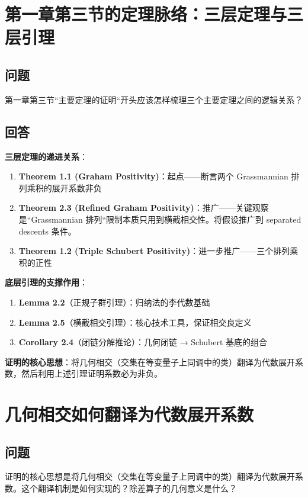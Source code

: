 \section{第一章第三节的定理脉络：三层定理与三层引理}\label{sec:TheoremFlowCh1S3}
\subsection{问题}
第一章第三节``主要定理的证明``开头应该怎样梳理三个主要定理之间的逻辑关系？
\subsection{回答}
\textbf{三层定理的递进关系}：
\begin{enumerate}
\item \textbf{Theorem 1.1 (Graham Positivity)}：起点——断言两个 Grassmannian 排列乘积的展开系数非负
\item \textbf{Theorem 2.3 (Refined Graham Positivity)}：推广——关键观察是``Grassmannian 排列``限制本质只用到横截相交性。将假设推广到 separated descents 条件。
\item \textbf{Theorem 1.2 (Triple Schubert Positivity)}：进一步推广——三个排列乘积的正性
\end{enumerate}

\textbf{底层引理的支撑作用}：
\begin{enumerate}
\item \textbf{Lemma 2.2}（正规子群引理）：归纳法的李代数基础
\item \textbf{Lemma 2.5}（横截相交引理）：核心技术工具，保证相交良定义
\item \textbf{Corollary 2.4}（闭链分解推论）：几何闭链 → Schubert 基底的组合
\end{enumerate}

\textbf{证明的核心思想}：将几何相交（交集在等变量子上同调中的类）翻译为代数展开系数，然后利用上述引理证明系数必为非负。
\section{几何相交如何翻译为代数展开系数}\label{sec:GeoToAlgebraTranslation}
\subsection{问题}
证明的核心思想是将几何相交（交集在等变量子上同调中的类）翻译为代数展开系数。这个翻译机制是如何实现的？除差算子的几何意义是什么？
